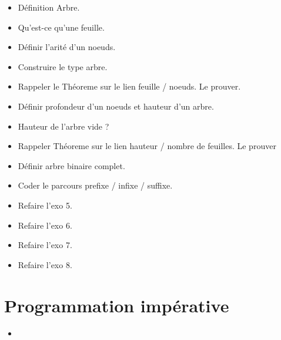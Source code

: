 \documentclass[a4paper, 11pt, hidelinks]{article}
\begin{document}
\begin{itemize}
    \item Définition Arbre.
    \item Qu'est-ce qu'une feuille.
    \item Définir l'arité d'un noeuds.
    \item Construire le type arbre.
    \item Rappeler le Théoreme sur le lien feuille / noeuds. Le prouver.
    \item Définir profondeur d'un noeuds et hauteur d'un arbre.
    \item Hauteur de l'arbre vide ?
    \item Rappeler Théoreme sur le lien hauteur / nombre de feuilles. Le prouver
    \item Définir arbre binaire complet.
    \item Coder le parcours prefixe / infixe / suffixe.
    \item Refaire l'exo 5.
    \item Refaire l'exo 6.
    \item Refaire l'exo 7.
    \item Refaire l'exo 8.
\end{itemize}



\section{Programmation impérative}

\begin{itemize}
    \item 
\end{itemize}
\end{document}
